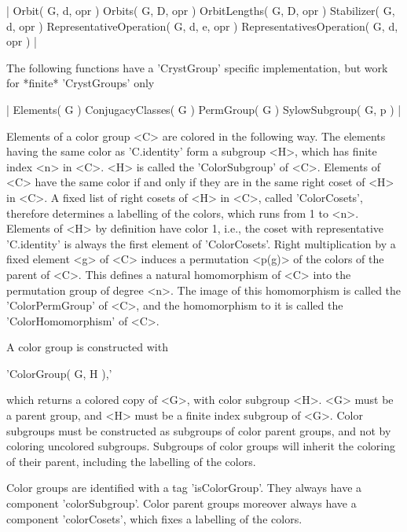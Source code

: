 |
     Orbit( G, d, opr )
     Orbits( G, D, opr )
     OrbitLengths( G, D, opr )
     Stabilizer( G, d, opr )
     RepresentativeOperation( G, d, e, opr )
     RepresentativesOperation( G, d, opr )
|

The following functions have  a 'CrystGroup' specific implementation, but
work for *finite* 'CrystGroups' only\:

|
     Elements( G )
     ConjugacyClasses( G )
     PermGroup( G )
     SylowSubgroup( G, p )
|


Elements of a  color  group <C> are colored   in the following  way.  The
elements having the same color as 'C.identity' form a subgroup <H>, which
has finite index <n> in  <C>.  <H> is  called the 'ColorSubgroup' of <C>.
Elements of <C> have the same color if and  only if they  are in the same
right coset of <H> in <C>.  A  fixed list of right  cosets of <H> in <C>,
called  'ColorCosets',  therefore determines  a  labelling of the colors,
which runs  from 1 to  <n>.  Elements of <H> by  definition have color 1,
i.e., the  coset with representative   'C.identity' is always  the  first
element of 'ColorCosets'.  Right multiplication by a fixed element <g> of
<C> induces a  permutation <p(g)>  of the colors  of  the parent of  <C>.
This defines a natural homomorphism of <C>  into the permutation group of
degree  <n>.   The  image    of    this  homomorphism  is    called   the
'ColorPermGroup'  of <C>,   and  the  homomorphism to  it is  called  the
'ColorHomomorphism' of <C>.



A color group is constructed with

'ColorGroup( G, H ),'

which returns a colored copy of <G>, with color subgroup <H>. <G> must be
a  parent group, and <H> must  be a finite  index subgroup  of <G>. Color
subgroups must be  constructed as subgroups  of color parent  groups, and
not  by coloring  uncolored  subgroups. Subgroups   of color  groups will
inherit the  coloring of  their parent, including   the labelling of  the
colors.

Color groups are identified with a tag  'isColorGroup'.  They always have
a component 'colorSubgroup'.  Color parent groups  moreover always have a
component 'colorCosets', which fixes a labelling of the colors.

